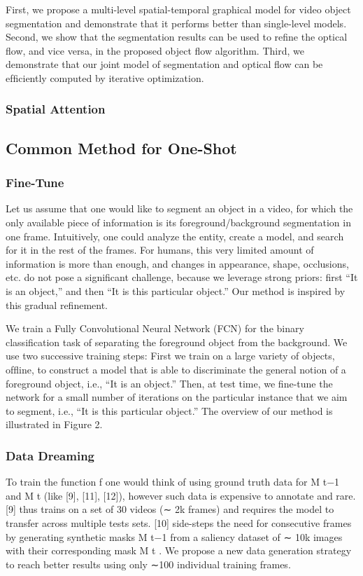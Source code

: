 First, we propose a multi-level spatial-temporal graphical model for video object segmentation and demonstrate that it performs better than single-level models. Second, we show that the segmentation results can be used to reﬁne the optical ﬂow, and vice versa, in the proposed object ﬂow algorithm. Third, we demonstrate that our joint model of segmentation and optical ﬂow can be efﬁciently computed by iterative optimization.

\subsubsection{Spatial Attention}


\subsection{Common Method for One-Shot}

\subsubsection{Fine-Tune}
Let us assume that one would like to segment an object in a video, for which the only available piece of information is its foreground/background segmentation in one frame. Intuitively, one could analyze the entity, create a model, and search for it in the rest of the frames. For humans, this very limited amount of information is more than enough, and changes in appearance, shape, occlusions, etc. do not pose a signiﬁcant challenge, because we leverage strong priors: ﬁrst “It is an object,” and then “It is this particular object.” Our method is inspired by this gradual reﬁnement.

We train a Fully Convolutional Neural Network (FCN) for the binary classiﬁcation task of separating the foreground object from the background. We use two successive training steps: First we train on a large variety of objects, ofﬂine, to construct a model that is able to discriminate the general notion of a foreground object, i.e., “It is an object.” Then, at test time, we ﬁne-tune the network for a small number of iterations on the particular instance that we aim to segment, i.e., “It is this particular object.” The overview of our method is illustrated in Figure 2.

\subsubsection{Data Dreaming}
To train the function f one would think of using ground truth data for M t−1 and M t (like [9], [11], [12]), however such data is expensive to annotate and rare. [9] thus trains on a set of 30 videos (∼ 2k frames) and requires the model to transfer across multiple tests sets. [10] side-steps the need for consecutive frames by generating synthetic masks M t−1 from a saliency dataset of ∼ 10k images with their corresponding mask M t . We propose a new data generation strategy to reach better results using only ∼100 individual training frames.

